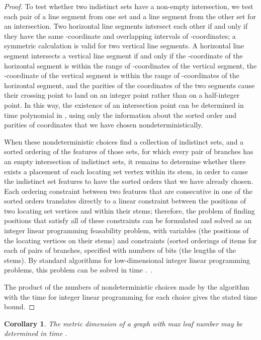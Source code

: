 \documentclass{jgaa-art}
\newtheorem{corollary}{Corollary}
\begin{document}
\begin{proof}
To test whether two indistinct sets have a non-empty intersection, we test each pair of a line segment from one set and a line segment from the other set for an intersection.
Two horizontal line segments intersect each other if and only if they have the same -coordinate and overlapping intervals of -coordinates; a symmetric calculation is valid for two vertical line segments. A horizontal line segment intersects a vertical line segment if and only if the -coordinate of the horizontal segment is within the range of -coordinates of the vertical segment, the -coordinate of the vertical segment is within the range of -coordinates of the horizontal segment, and the parities of the coordinates of the two segments cause their crossing point to land on an integer point rather than on a half-integer point. In this way, the existence of an intersection point can be determined in time polynomial in , using only the information about the sorted order and parities of coordinates that we have chosen nondeterministically.

When these nondeterministic choices find a collection of indistinct sets, and a sorted ordering of the features of those sets, for which every pair of branches has an empty intersection of indistinct sets, it remains to determine whether there exists a placement of each locating set vertex within its stem, in order to cause the indistinct set features to have the sorted orders that we have already chosen. Each ordering constraint between two features that are consecutive in one of the sorted orders translates directly to a linear constraint between the positions of two locating set vertices  and  within their stems; therefore, the problem of finding positions that satisfy all of these constraints can be formulated and solved as an integer linear programming feasability problem, with  variables (the positions of the locating vertices on their stems) and  constraints (sorted orderings of  items for each of  pairs of branches, specified with numbers of  bits (the lengths of the stems).
By standard algorithms for low-dimensional integer linear programming problems, this problem can be solved in time .~\cite{Len-MOR-83,Kan-MOR-87,FraTar-Comb-87,Cla-JACM-95}.

The product of the numbers of nondeterministic choices made by the algorithm with the time for integer linear programming for each choice gives the stated time bound.
\end{proof}

\begin{corollary}
The metric dimension of a graph with max leaf number  may be determined in time .
\end{corollary}
\end{document}
